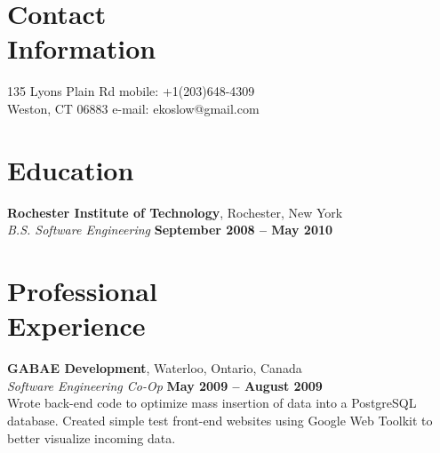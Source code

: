 \documentclass[margin,line]{resume}
\begin{document}
\begin{resume}

    \section{\mysidestyle Contact\\Information}

    135 Lyons Plain Rd                          \hfill mobile: +1(203)648-4309          \vspace{0mm}\\\vspace{0mm}%
    Weston, CT 06883                            \hfill e-mail: ekoslow@gmail.com  \vspace{0mm}\\\vspace{-4.5mm}%


    \section{\mysidestyle Education}

    \textbf{Rochester Institute of Technology}, Rochester, New York \vspace{2mm}\\\vspace{1mm}%
    \textsl{B.S. Software Engineering} \hfill \textbf{September 2008 -- May 2010}\vspace{-3mm}\\\vspace{-1mm}%


    \section{\mysidestyle Professional\\Experience}

    \textbf{GABAE Development}, Waterloo, Ontario, Canada \vspace{2mm}\\\vspace{1mm}%
    \textsl{Software Engineering Co-Op} \hfill \textbf{May 2009 -- August 2009}\\
    Wrote back-end code to optimize mass insertion of data into a PostgreSQL database.
    Created simple test front-end websites using Google Web Toolkit to better visualize 
    incoming data.



\end{resume}
\end{document}
